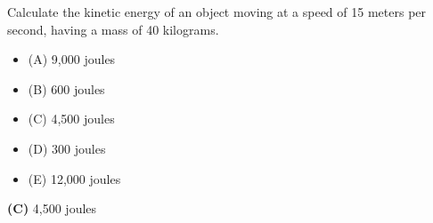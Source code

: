 

Calculate the kinetic energy of an object moving at a speed of 15 meters per second, having a mass of 40 kilograms.

\begin{itemize}
\item{(A)} 9,000 joules
\vskip 5pt 
\item{(B)} 600 joules
\vskip 5pt 
\item{(C)} 4,500 joules
\vskip 5pt 
\item{(D)} 300 joules
\vskip 5pt 
\item{(E)} 12,000 joules
\end{itemize}







{\bf (C)} 4,500 joules
 










